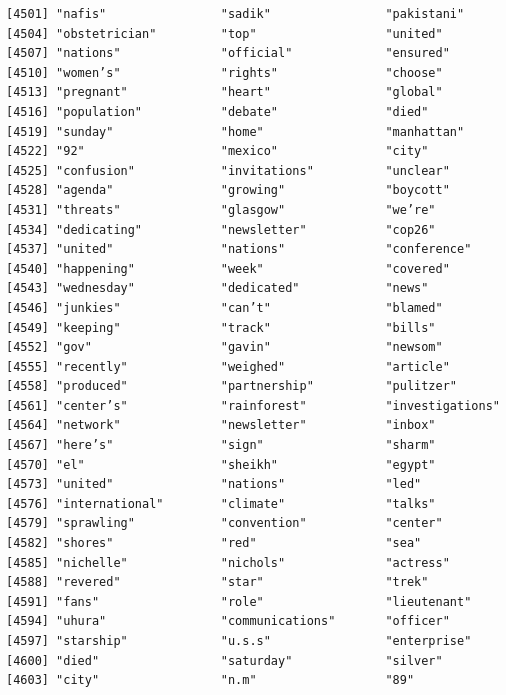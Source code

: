 \documentclass[
  letterpaper,
  DIV=11,
  numbers=noendperiod]{scrartcl}
\begin{document}
\begin{verbatim}
[4501] "nafis"                "sadik"                "pakistani"           
[4504] "obstetrician"         "top"                  "united"              
[4507] "nations"              "official"             "ensured"             
[4510] "women’s"              "rights"               "choose"              
[4513] "pregnant"             "heart"                "global"              
[4516] "population"           "debate"               "died"                
[4519] "sunday"               "home"                 "manhattan"           
[4522] "92"                   "mexico"               "city"                
[4525] "confusion"            "invitations"          "unclear"             
[4528] "agenda"               "growing"              "boycott"             
[4531] "threats"              "glasgow"              "we’re"               
[4534] "dedicating"           "newsletter"           "cop26"               
[4537] "united"               "nations"              "conference"          
[4540] "happening"            "week"                 "covered"             
[4543] "wednesday"            "dedicated"            "news"                
[4546] "junkies"              "can’t"                "blamed"              
[4549] "keeping"              "track"                "bills"               
[4552] "gov"                  "gavin"                "newsom"              
[4555] "recently"             "weighed"              "article"             
[4558] "produced"             "partnership"          "pulitzer"            
[4561] "center’s"             "rainforest"           "investigations"      
[4564] "network"              "newsletter"           "inbox"               
[4567] "here’s"               "sign"                 "sharm"               
[4570] "el"                   "sheikh"               "egypt"               
[4573] "united"               "nations"              "led"                 
[4576] "international"        "climate"              "talks"               
[4579] "sprawling"            "convention"           "center"              
[4582] "shores"               "red"                  "sea"                 
[4585] "nichelle"             "nichols"              "actress"             
[4588] "revered"              "star"                 "trek"                
[4591] "fans"                 "role"                 "lieutenant"          
[4594] "uhura"                "communications"       "officer"             
[4597] "starship"             "u.s.s"                "enterprise"          
[4600] "died"                 "saturday"             "silver"              
[4603] "city"                 "n.m"                  "89"                  

\end{verbatim}
\end{document}

